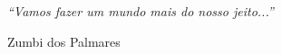 \documentclass[a4paper, 11pt, oneside]{Relatorio_sem}  %
\begin{document}
 
 
 
 
 
 
 

\pagestyle{empty}  %

\null\vfill
\textit{``Vamos fazer um mundo mais do nosso jeito...''}

\begin{flushright}
Zumbi dos Palmares
\end{flushright}

\vfill\vfill\vfill\vfill\vfill\vfill\null
\clearpage  %
\end{document}
